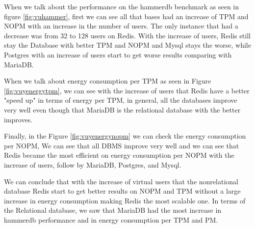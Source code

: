     When we talk about the performance on the hammerdb benchmark as seen in figure \ref{fig:vuhammer}, first we can see all that bases had an increase of TPM and NOPM with an increase in the number of users. The only instance that had a decrease was from 32 to 128 users on Redis. With the increase of users, Redis still stay the Database with better TPM and NOPM and Mysql stays the worse, while Postgres with an increase of users start to get worse results comparing with MariaDB.
    
    When we talk about energy consumption per TPM as seen in Figure \ref{fig:vuyenergytpm}, we can see with the increase of users that Redis have a better "speed up" in terms of energy per TPM, in general, all the databases improve very well even though that MariaDB is the relational database with the better improves.
    
    Finally, in the Figure \ref{fig:vuyenergynopm} we can check the energy consumption per NOPM, We can see that all DBMS improve very well and we can see that Redis became the most efficient on energy consumption per NOPM with the increase of users, follow by MariaDB, Postgres, and Mysql.
    
    We can conclude that with the increase of virtual users that the nonrelational database Redis start to get better results on NOPM and TPM without a large increase in energy consumption making Redis the most scalable one. In terms of the Relational database, we saw that MariaDB had the most increase in hammerdb performance and in energy consumption per TPM and PM.
    